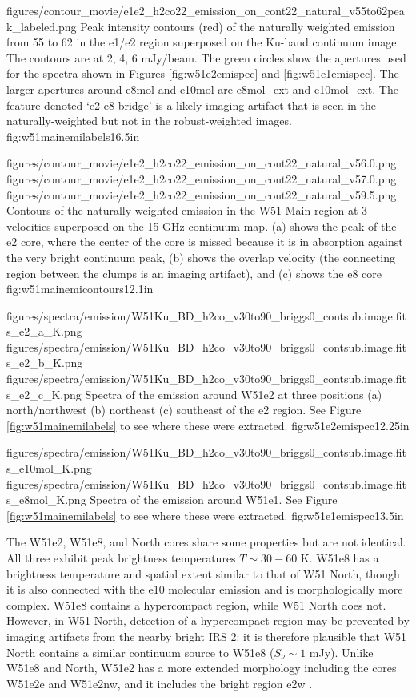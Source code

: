 \Figure
{figures/contour_movie/e1e2_h2co22_emission_on_cont22_natural_v55to62peak_labeled.png}
{ Peak intensity contours (red) of the naturally weighted \formaldehyde \twotwo
emission from 55 to 62 \kms in the e1/e2 region superposed on the Ku-band
continuum image.  The contours are at 2, 4, 6 mJy/beam.  The green circles show
the apertures used for the spectra shown in Figures
\ref{fig:w51e2emispec} and
\ref{fig:w51e1emispec}.  The larger apertures around e8mol and e10mol are
e8mol\_ext and e10mol\_ext.  The feature denoted `e2-e8 bridge' is a likely
imaging artifact that is seen in the naturally-weighted but not in the
robust-weighted images.
}{fig:w51mainemilabels}{1}{6.5in}

\FigureThreeAA
{figures/contour_movie/e1e2_h2co22_emission_on_cont22_natural_v56.0.png}
{figures/contour_movie/e1e2_h2co22_emission_on_cont22_natural_v57.0.png}
{figures/contour_movie/e1e2_h2co22_emission_on_cont22_natural_v59.5.png}
{Contours of the \formaldehyde \twotwo naturally weighted emission in the W51
Main region at 3 velocities superposed on the 15 GHz continuum map.  (a) shows
the peak of the e2 core, where the center of the core is missed because it is
in absorption against the very bright continuum peak, (b) shows the overlap
velocity (the connecting region between the clumps is an imaging artifact), and
(c) shows the e8 core}
{fig:w51mainemicontours}{1}{2.1in}

\FigureThreeAA
{figures/spectra/emission/W51Ku_BD_h2co_v30to90_briggs0_contsub.image.fits_e2_a_K.png}
{figures/spectra/emission/W51Ku_BD_h2co_v30to90_briggs0_contsub.image.fits_e2_b_K.png}
{figures/spectra/emission/W51Ku_BD_h2co_v30to90_briggs0_contsub.image.fits_e2_c_K.png}
{Spectra of the \twotwo emission around W51e2 at three positions (a)
north/northwest (b) northeast (c) southeast of the e2 \hchii region.  See Figure
\ref{fig:w51mainemilabels} to see where these were extracted.}
{fig:w51e2emispec}{1}{2.25in}

\FigureTwoAA
{figures/spectra/emission/W51Ku_BD_h2co_v30to90_briggs0_contsub.image.fits_e10mol_K.png}
{figures/spectra/emission/W51Ku_BD_h2co_v30to90_briggs0_contsub.image.fits_e8mol_K.png}
{Spectra of the \twotwo emission around W51e1.  See Figure
\ref{fig:w51mainemilabels} to see where these were extracted.
}
{fig:w51e1emispec}{1}{3.5in}



The W51e2, W51e8, and North cores share some properties but are not identical.
All three exhibit peak brightness temperatures $T\sim30-60$ K.  W51e8 has a
brightness temperature and spatial extent similar to that of W51 North, though
it is also connected with the e10 molecular emission and is morphologically
more complex.  W51e8 contains a hypercompact \hii region, while W51 North does
not.  However, in W51 North, detection of a hypercompact \hii region may be prevented by
imaging artifacts from the nearby bright IRS 2: it is therefore plausible that
W51 North contains a similar continuum source to W51e8 ($S_\nu \sim 1$ mJy).
Unlike W51e8 and North, W51e2 has a more extended morphology including
the cores W51e2e and W51e2nw, and it includes the bright \hchii region e2w
\citep{Shi2010a,Goddi2015a}.

